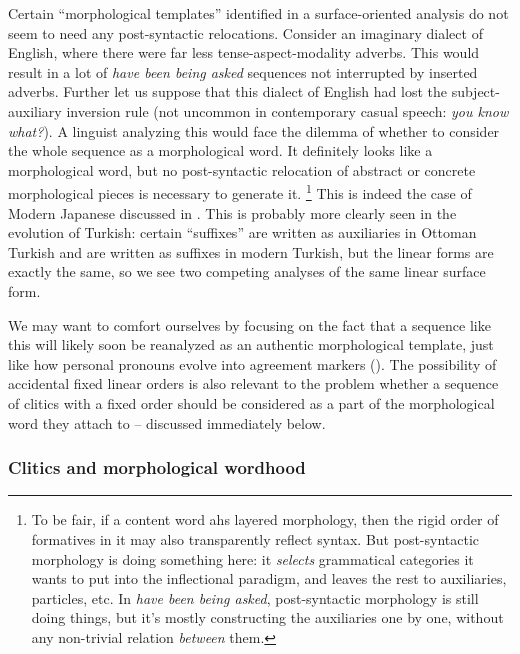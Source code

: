 \documentclass[a4paper, oneside, scheme=plain, 12pt]{article}
\newcommand{\form}[1]{\emph{#1}}
\begin{document}
Certain ``morphological templates'' identified in a surface-oriented analysis
do not seem to need any post-syntactic relocations.
Consider an imaginary dialect of English,
where there were far less tense-aspect-modality adverbs.
This would result in a lot of \form{have been being asked} sequences
not interrupted by inserted adverbs.
Further let us suppose that this dialect of English had lost the subject-auxiliary inversion rule
(not uncommon in contemporary casual speech: \form{you know what?}).
A linguist analyzing this would face the dilemma of whether to
consider the whole sequence as a morphological word.
It definitely looks like a morphological word,
but no post-syntactic relocation of abstract or concrete morphological pieces is necessary to generate it.%
\footnote{
    To be fair, if a content word ahs layered morphology,
    then the rigid order of formatives in it may also transparently reflect syntax.
    But post-syntactic morphology is doing something here:
    it \emph{selects} grammatical categories it wants to put into the inflectional paradigm,
    and leaves the rest to auxiliaries, particles, etc.
    In \form{have been being asked}, post-syntactic morphology is still doing things,
    but it's mostly constructing the auxiliaries one by one,
    without any non-trivial relation \emph{between} them.
}
This is indeed the case of Modern Japanese discussed in .
This is probably more clearly seen in the evolution of Turkish:
certain ``suffixes'' are written as auxiliaries in Ottoman Turkish
and are written as suffixes in modern Turkish,
but the linear forms are exactly the same,
so we see two competing analyses of the same linear surface form.

We may want to comfort ourselves by focusing on the fact that a sequence like this will likely soon be reanalyzed as an authentic morphological template,
just like how personal pronouns evolve into agreement markers
().
The possibility of accidental fixed linear orders
is also relevant to the problem whether a sequence of clitics with a fixed order
should be considered as a part of the morphological word they attach to -- discussed immediately below.

\subsubsection{Clitics and morphological wordhood}\label{sec:morphological-wordhood-clitics}
\end{document}
